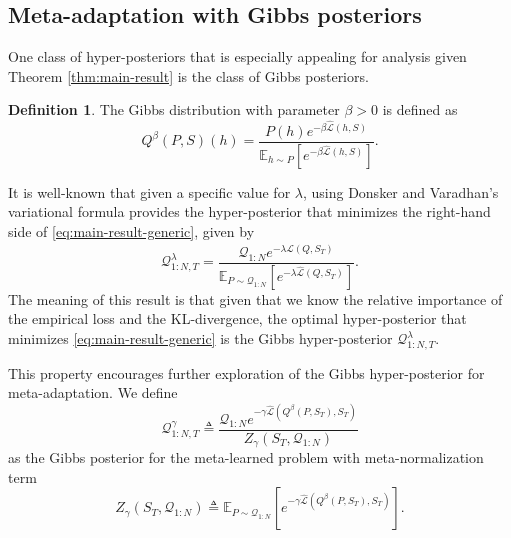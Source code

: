 \documentclass{article} %
\theoremstyle{definition}
\newtheorem{defn}{Definition}[section]
\newcommand{\Expect}[2]{\mathbb{E}_{#1}\left [#2 \right ]}
\begin{document}

\subsection{Meta-adaptation with Gibbs posteriors} \label{sec:adapt-gibbs}

One class of hyper-posteriors that is especially appealing for analysis given Theorem \ref{thm:main-result} is the class of Gibbs posteriors.

\begin{defn} \label{defn:Gibbs}
	The Gibbs distribution with parameter $\beta>0$ is defined as 
	$$
	Q^\beta(P,S)(h)=\frac{P(h)e^{-\beta \hat{\mathcal{L}}(h,S)}}{\Expect{h\sim P}{e^{-\beta\hat{\mathcal{L}}(h,S)}}}.
	$$
\end{defn}

It is well-known \citep{Catoni2004} that given a specific value for $\lambda$, using Donsker and Varadhan’s variational formula \citep{Donsker1975} provides the hyper-posterior that minimizes the right-hand side of \eqref{eq:main-result-generic}, given by
%
\begin{equation*}
    \mathcal{Q}^{\lambda}_{1:N,T}=\frac{\mathcal{Q}_{1:N}e^{-\lambda\hat{\mathcal{L}}(Q,S_T)}}{\Expect{P\sim \mathcal{Q}_{1:N}}{e^{-\lambda\hat{\mathcal{L}}(Q,S_T)}}} .
\end{equation*}
The meaning of this result is that given that we know the relative importance of the empirical loss and the KL-divergence, the optimal hyper-posterior that minimizes \eqref{eq:main-result-generic} is the Gibbs hyper-posterior $\mathcal{Q}^{\lambda}_{1:N,T}$.

This property encourages further exploration of the Gibbs hyper-posterior for meta-adaptation. We define 
\begin{equation} \label{eq:aml-post-defn}
\mathcal{Q}^{\gamma}_{1:N,T}\triangleq \frac{\mathcal{Q}_{1:N}e^{-\gamma\hat{\mathcal{L}}(Q^\beta(P,S_T),S_T)}}{Z_\gamma(S_T, \mathcal{Q}_{1:N})}
\end{equation} 
as the Gibbs posterior for the meta-learned problem with meta-normalization term $$Z_\gamma(S_T, \mathcal{Q}_{1:N})\triangleq \Expect{P\sim \mathcal{Q}_{1:N}}{e^{-\gamma\hat{\mathcal{L}}(Q^\beta(P,S_T),S_T)}} .$$
\end{document}
